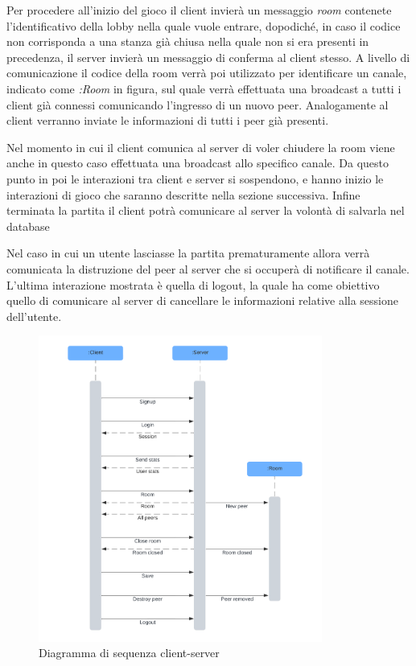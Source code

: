 Per procedere all'inizio del gioco il client invierà un messaggio \emph{room} contenete l'identificativo della lobby nella quale vuole entrare, dopodiché, in caso il codice non corrisponda a una stanza già chiusa nella quale non si era presenti in precedenza, il server invierà un messaggio di conferma al client stesso.
A livello di comunicazione il codice della room verrà poi utilizzato per identificare un canale, indicato come \emph{:Room} in figura, sul quale verrà effettuata una broadcast a tutti i client già connessi comunicando l'ingresso di un nuovo peer. Analogamente al client verranno inviate le informazioni di tutti i peer già presenti.

Nel momento in cui il client comunica al server di voler chiudere la room viene anche in questo caso effettuata una broadcast allo specifico canale.
Da questo punto in poi le interazioni tra client e server si sospendono, e hanno inizio le interazioni di gioco che saranno descritte nella sezione successiva.
Infine terminata la partita il client potrà comunicare al server la volontà di salvarla nel database

Nel caso in cui un utente lasciasse la partita prematuramente allora verrà comunicata la distruzione del peer al server che si occuperà di notificare il canale. L'ultima interazione mostrata è quella di logout, la quale ha come obiettivo quello di comunicare al server di cancellare le informazioni relative alla sessione dell'utente.

\begin{figure}[H]
\centering
\includegraphics[width=0.83\textwidth]{img/draw/uml_sequence_client_server.png}
\caption{Diagramma di sequenza client-server}
\label{fig:clientServerSequence}
\end{figure}


